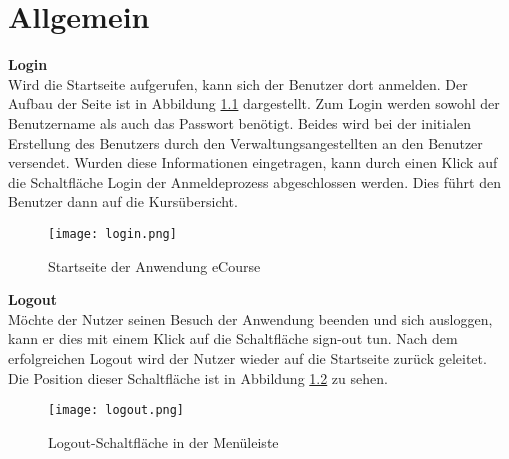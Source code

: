 
\chapter{Allgemein}
\label{sec:chapAllgemein} 
\textbf{Login}\\
Wird die Startseite aufgerufen, kann sich der Benutzer dort anmelden. Der Aufbau der Seite ist in Abbildung \ref{fib:start} dargestellt.
Zum Login werden sowohl der Benutzername als auch das Passwort benötigt. Beides wird bei der initialen Erstellung des Benutzers durch den Verwaltungsangestellten an den Benutzer versendet. Wurden diese Informationen eingetragen, kann durch einen Klick auf die Schaltfläche \glqq Login\grqq{} der Anmeldeprozess abgeschlossen werden.
Dies führt den Benutzer dann auf die Kursübersicht.

\begin{figure}[h]
\centering
\texttt{[image: login.png]}
\caption{Startseite der Anwendung eCourse}
\label{fib:start}
\end{figure}

\textbf{Logout}\\
Möchte der Nutzer seinen Besuch der Anwendung beenden und sich ausloggen, kann er dies mit einem Klick auf die Schaltfläche \glqq sign-out\grqq{} tun. Nach dem erfolgreichen Logout wird der Nutzer wieder auf die Startseite zurück geleitet. Die Position dieser Schaltfläche ist in Abbildung \ref{fib:logout} zu sehen.

\begin{figure}[h]
\centering
\texttt{[image: logout.png]}
\caption{Logout-Schaltfläche in der Menüleiste}
\label{fib:logout}
\end{figure}